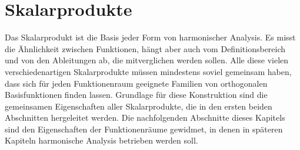 %
%
%
\chapter{Skalarprodukte
\label{buch:chapter:skalarprodukte}}

Das Skalarprodukt ist die Basis jeder Form von harmonischer Analysis.
Es misst die Ähnlichkeit zwischen Funktionen, hängt aber auch vom
Definitionsbereich und von den Ableitungen ab, die mitverglichen werden
sollen.
Alle diese vielen verschiedenartigen Skalarprodukte müssen mindestens
soviel gemeinsam haben, dass sich für jeden Funktionenraum geeignete
Familien von orthogonalen Basisfunktionen finden lassen.
Grundlage für diese Konstruktion sind die gemeinsamen Eigenschaften
aller Skalarprodukte, die in den ersten beiden Abschnitten hergeleitet
werden.
Die nachfolgenden Abschnitte dieses Kapitels sind den Eigenschaften der
Funktionenräume gewidmet, in denen in späteren Kapiteln harmonische
Analysis betrieben werden soll.








